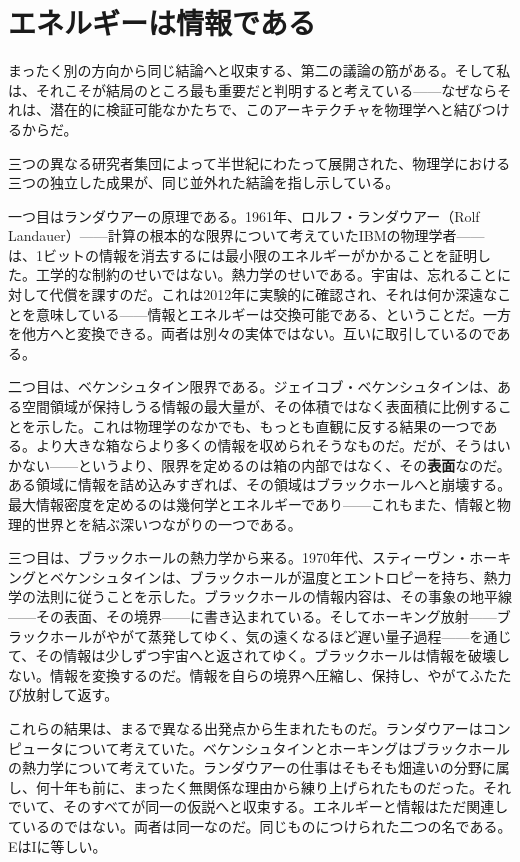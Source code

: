 \documentclass[11pt, twoside, openright]{book}
\begin{document}
\section*{エネルギーは情報である}

まったく別の方向から同じ結論へと収束する、第二の議論の筋がある。そして私は、それこそが結局のところ最も重要だと判明すると考えている------なぜならそれは、潜在的に検証可能なかたちで、このアーキテクチャを物理学へと結びつけるからだ。

三つの異なる研究者集団によって半世紀にわたって展開された、物理学における三つの独立した成果が、同じ並外れた結論を指し示している。

一つ目はランダウアーの原理である。1961年、ロルフ・ランダウアー（Rolf Landauer）------計算の根本的な限界について考えていたIBMの物理学者------は、1ビットの情報を消去するには最小限のエネルギーがかかることを証明した。工学的な制約のせいではない。熱力学のせいである。宇宙は、忘れることに対して代償を課すのだ。これは2012年に実験的に確認され、それは何か深遠なことを意味している------情報とエネルギーは交換可能である、ということだ。一方を他方へと変換できる。両者は別々の実体ではない。互いに取引しているのである。

二つ目は、ベケンシュタイン限界である。ジェイコブ・ベケンシュタインは、ある空間領域が保持しうる情報の最大量が、その体積ではなく表面積に比例することを示した。これは物理学のなかでも、もっとも直観に反する結果の一つである。より大きな箱ならより多くの情報を収められそうなものだ。だが、そうはいかない------というより、限界を定めるのは箱の内部ではなく、その\textbf{表面}なのだ。ある領域に情報を詰め込みすぎれば、その領域はブラックホールへと崩壊する。最大情報密度を定めるのは幾何学とエネルギーであり------これもまた、情報と物理的世界とを結ぶ深いつながりの一つである。

三つ目は、ブラックホールの熱力学から来る。1970年代、スティーヴン・ホーキングとベケンシュタインは、ブラックホールが温度とエントロピーを持ち、熱力学の法則に従うことを示した。ブラックホールの情報内容は、その事象の地平線------その表面、その境界------に書き込まれている。そしてホーキング放射------ブラックホールがやがて蒸発してゆく、気の遠くなるほど遅い量子過程------を通じて、その情報は少しずつ宇宙へと返されてゆく。ブラックホールは情報を破壊しない。情報を変換するのだ。情報を自らの境界へ圧縮し、保持し、やがてふたたび放射して返す。

これらの結果は、まるで異なる出発点から生まれたものだ。ランダウアーはコンピュータについて考えていた。ベケンシュタインとホーキングはブラックホールの熱力学について考えていた。ランダウアーの仕事はそもそも畑違いの分野に属し、何十年も前に、まったく無関係な理由から練り上げられたものだった。それでいて、そのすべてが同一の仮説へと収束する。エネルギーと情報はただ関連しているのではない。両者は同一なのだ。同じものにつけられた二つの名である。EはIに等しい。
\end{document}
